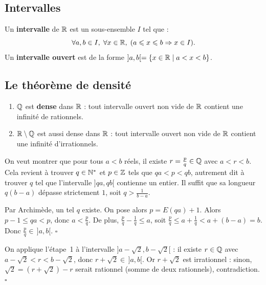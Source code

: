 \subsection{Intervalles}

\begin{defbox}[--- Intervalle]
Un \textbf{intervalle} de $\mathbb{R}$ est un sous-ensemble $I$ tel que :
\[
  \forall a, b \in I,\; \forall x \in \mathbb{R},\; (a \leqslant x \leqslant b \Rightarrow x \in I).
\]
Un \textbf{intervalle ouvert} est de la forme $]a, b[ = \{ x \in \mathbb{R} \mid a < x < b \}$.
\end{defbox}

\subsection{Le théorème de densité}

\begin{thmbox}[--- Densité]
\begin{enumerate}[leftmargin=1cm]
  \item $\mathbb{Q}$ est \textbf{dense} dans $\mathbb{R}$ : tout intervalle ouvert non vide de $\mathbb{R}$ contient une infinité de rationnels.
  \item $\mathbb{R} \setminus \mathbb{Q}$ est aussi dense dans $\mathbb{R}$ : tout intervalle ouvert non vide de $\mathbb{R}$ contient une infinité d'irrationnels.
\end{enumerate}
\end{thmbox}

\begin{proofbox}
On veut montrer que pour tous $a < b$ réels, il existe $r = \frac{p}{q} \in \mathbb{Q}$ avec $a < r < b$. Cela revient à trouver $q \in \mathbb{N}^*$ et $p \in \mathbb{Z}$ tels que $qa < p < qb$, autrement dit à trouver $q$ tel que l'intervalle $]qa, qb[$ contienne un entier. Il suffit que sa longueur $q(b-a)$ dépasse strictement $1$, soit $q > \frac{1}{b-a}$.

Par Archimède, un tel $q$ existe. On pose alors $p = E(qa) + 1$. Alors $p - 1 \leqslant qa < p$, donc $a < \frac{p}{q}$. De plus, $\frac{p}{q} - \frac{1}{q} \leqslant a$, soit $\frac{p}{q} \leqslant a + \frac{1}{q} < a + (b-a) = b$. Donc $\frac{p}{q} \in \,]a, b[$. \hfill$\square$
\end{proofbox}

\begin{proofbox}
On applique l'étape~1 à l'intervalle $]a - \sqrt{2}, b - \sqrt{2}[$ : il existe $r \in \mathbb{Q}$ avec $a - \sqrt{2} < r < b - \sqrt{2}$, donc $r + \sqrt{2} \in \,]a, b[$. Or $r + \sqrt{2}$ est irrationnel : sinon, $\sqrt{2} = (r + \sqrt{2}) - r$ serait rationnel (somme de deux rationnels), contradiction. \hfill$\square$
\end{proofbox}

